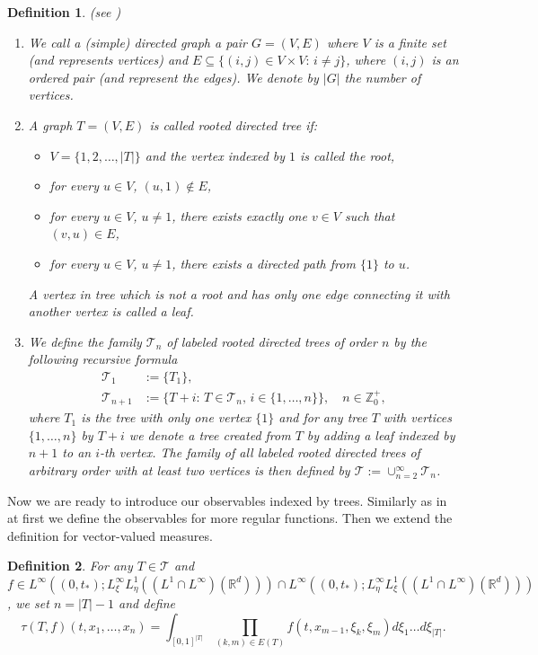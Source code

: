 \documentclass[10pt]{article}
\newtheorem{defi}{Definition}
\newcommand{\eqq}[2]{\begin{equation}  #1  \label{#2}\end{equation}    }
\newcommand{\R}{\mathbb{R}}
\newcommand{\Tree}{\mathcal{T}}
\begin{document}
\begin{defi}(see \cite[Definition 4.1]{JPS2025})
~
\begin{enumerate}
\item We call a   (simple) directed graph a pair $G=(V,E)$ where $V$ is a finite set (and represents vertices) and $E\subseteq \{(i,j)\in V\times V:\,i\neq j\}$, where $(i,j)$ is an ordered pair (and represent the edges). 
We denote by $|G|$ the number of vertices. 
\item A graph $T=(V,E)$ is called rooted directed tree if:
\begin{itemize}
\item $V=\{1,2,\dots,|T|\}$ and the vertex indexed by $1$ is called the root, 
\item for every $u\in V$, $(u,1)\notin E$,
\item for every $u\in V$, $u\neq 1$, there exists exactly one $v \in V$ such that $(v,u) \in E$, 
\item for every $u\in V$, $u\neq 1$, there exists a directed path from $\{1\}$ to $u$.
\end{itemize}
A vertex in tree which is not a root and has only one edge connecting it with another vertex is called a leaf.

 
\item We define the family $\Tree_n$ of  labeled rooted directed trees of order $n$ by the following recursive formula
\begin{align*}
\Tree_1&:=\{T_1\},\\
\Tree_{n+1}&:=\{T+i:\,T\in \Tree_n,\,i\in \{1,\ldots,n\}\},\quad n\in \mathbb{Z}_0^+,
\end{align*}
where $T_1$ is the  tree with only one vertex $\{1\}$ and for any tree $T$ with vertices $\{1,\ldots,n\}$ by $T+i$ we denote a tree created from $T$ by adding a leaf indexed by $n+1$ to an $i$-th vertex. The family of all labeled rooted directed trees of arbitrary order with at least two vertices is then defined by $\Tree:=\cup_{n=2}^\infty\Tree_n$. 
\end{enumerate}
\end{defi}

Now we are ready to introduce our observables indexed by trees. Similarly as in \cite{JPS2025} at first we define the observables for more regular functions. Then we extend the definition for vector-valued measures.


\begin{defi}\label{tau}
For any $T\in \Tree$ and $f\in L^\infty((0,t_{*});L^{\infty}_\xi L^1_\eta ( (L^1\cap L^{\infty})(\R^d)))\cap L^\infty((0,t_{*});L^{\infty}_\eta L^1_\xi ( (L^1\cap L^{\infty})(\R^d)))$, we set $n=|T|-1$ and define 
\eqq{
\tau(T,f)(t,x_1,\dots,x_n) = \int_{[0,1]^{|T|}} \prod_ {(k,m)\in E(T)} f(t,x_{m-1},\xi_k,\xi_m)d\xi_1\dots d\xi_{|T|}.
}{reptau}
\end{defi}
\end{document}
